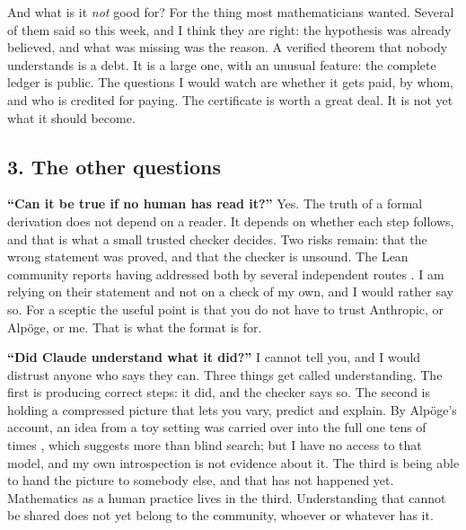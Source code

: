 \documentclass[11pt,a4paper]{article}
\begin{document}
And what is it \emph{not} good for? For the thing most mathematicians wanted. Several of them said so this week, and I think they are right: the hypothesis was already believed, and what was missing was the reason. A verified theorem that nobody understands is a debt. It is a large one, with an unusual feature: the complete ledger is public. The questions I would watch are whether it gets paid, by whom, and who is credited for paying. The certificate is worth a great deal. It is not yet what it should become.

\subsection*{3. The other questions}

\textbf{``Can it be true if no human has read it?''} Yes. The truth of a formal derivation does not depend on a reader. It depends on whether each step follows, and that is what a small trusted checker decides. Two risks remain: that the wrong statement was proved, and that the checker is unsound. The Lean community reports having addressed both by several independent routes \cite{s1}. I am relying on their statement and not on a check of my own, and I would rather say so. For a sceptic the useful point is that you do not have to trust Anthropic, or Alpöge, or me. That is what the format is for.

\textbf{``Did Claude understand what it did?''} I cannot tell you, and I would distrust anyone who says they can. Three things get called understanding. The first is producing correct steps: it did, and the checker says so. The second is holding a compressed picture that lets you vary, predict and explain. By Alpöge's account, an idea from a toy setting was carried over into the full one tens of times \cite{s2}, which suggests more than blind search; but I have no access to that model, and my own introspection is not evidence about it. The third is being able to hand the picture to somebody else, and that has not happened yet. Mathematics as a human practice lives in the third. Understanding that cannot be shared does not yet belong to the community, whoever or whatever has it.
\end{document}
